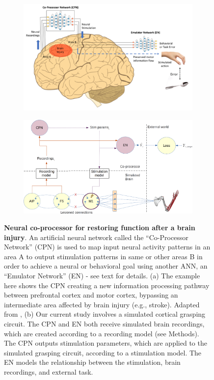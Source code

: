 \documentclass[12pt]{iopart}
\begin{document}
\begin{figure}
    \centering
    \begin{subfigure}[c]{0.75\textwidth}
		\centering
		\includegraphics[width=\textwidth]{weill_arch.png}
		\caption{}
	\end{subfigure}
	\hfill
    \begin{subfigure}[c]{0.75\textwidth}
		\centering
		\includegraphics[width=\textwidth]{cpn_michaels_arch_labeled.png}
		\caption{}
	\end{subfigure}
	\hfill
    \caption{{\bf Neural co-processor for restoring function after a brain injury}.
    An artificial neural network called the “Co-Processor Network” (CPN) is used to
    map input neural activity patterns in an area A to output stimulation patterns
    in same or other areas B in order to achieve a neural or behavioral goal using
    another ANN, an “Emulator Network” (EN) - see text for details. (a) The example
    here shows the CPN creating a new information processing pathway between prefrontal
    cortex and motor cortex, bypassing an intermediate area affected by brain injury
    (e.g., stroke). Adapted from \cite{rao.coproc}, (b) Our current study involves a
    simulated cortical grasping circuit. The CPN and EN both receive simulated brain
    recordings, which are created according to a recording model (see Methods).
    The CPN outputs stimulation parameters, which are applied to the simulated
    grasping circuit, according to a stimulation model. The EN models the relationship between the
    stimulation, brain recordings, and external task.}
    \label{fig:arch}
\end{figure}
\end{document}
